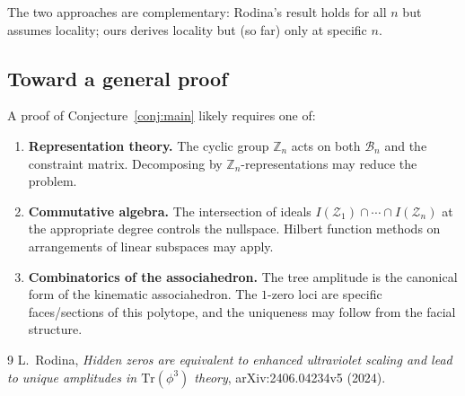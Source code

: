 \documentclass[11pt]{article}
\theoremstyle{plain}
\theoremstyle{definition}
\newcommand{\cB}{\mathcal{B}}
\newcommand{\cZ}{\mathcal{Z}}
\newcommand{\Z}{\mathbb{Z}}
\begin{document}
The two approaches are complementary: Rodina's result holds for all $n$ but assumes
locality; ours derives locality but (so far) only at specific $n$.

\subsection{Toward a general proof}

A proof of Conjecture~\ref{conj:main} likely requires one of:

\begin{enumerate}[nosep]
\item \textbf{Representation theory.} The cyclic group $\Z_n$ acts on both $\cB_n$ and
the constraint matrix. Decomposing by $\Z_n$-representations may reduce the problem.
\item \textbf{Commutative algebra.} The intersection of ideals
$I(\cZ_1) \cap \cdots \cap I(\cZ_n)$ at the appropriate degree controls the
nullspace. Hilbert function methods on arrangements of linear subspaces may apply.
\item \textbf{Combinatorics of the associahedron.} The tree amplitude is the
canonical form of the kinematic associahedron. The $1$-zero loci are specific
faces/sections of this polytope, and the uniqueness may follow from the facial
structure.
\end{enumerate}

\begin{thebibliography}{9}
L.~Rodina, \emph{Hidden zeros are equivalent to enhanced ultraviolet scaling and
lead to unique amplitudes in $\mathrm{Tr}(\phi^3)$ theory}, arXiv:2406.04234v5 (2024).
\end{thebibliography}
\end{document}
